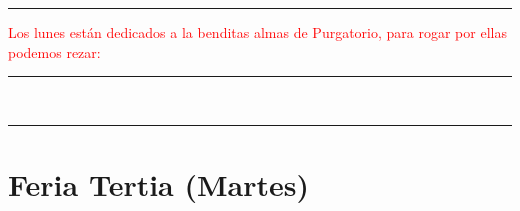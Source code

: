 \documentclass[10pt,twoside]{book}
\begin{document}


\vspace{0.5em}



\vspace{0.75em}





\vspace{0.75em}





\vspace{0.75em}





\vspace{0.75em}





\iralfinal

\begin{center}
      {\rule{10em}{0.4pt}}

      \vspace{0.75em}

      \textcolor{red}{Los lunes están dedicados a la benditas almas de Purgatorio, para rogar por ellas podemos rezar:}
\end{center}

\begin{multicols}{2}

      

\end{multicols}

\begin{center}
      \begin{spacing}{0.25}
            {\rule{20em}{0.4pt}}\\
            {\rule{20em}{0.4pt}}
      \end{spacing}
\end{center}


\section*{\centering Feria Tertia (Martes)}
\end{document}
